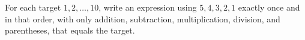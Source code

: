 For each target $1,2,\ldots,10$, write an expression using $5,4,3,2,1$ exactly once and in that order, with only addition, subtraction, multiplication, division, and parentheses, that equals the target.

